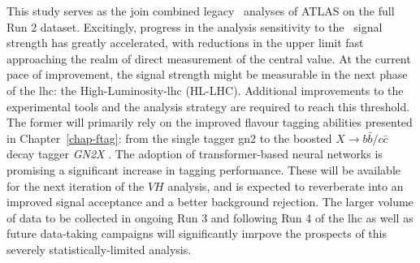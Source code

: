 This study serves as the join combined legacy \vhbc\ analyses of ATLAS on the full Run 2 dataset. Excitingly, progress in the analysis sensitivity to the \vhc\ signal strength has greatly accelerated, with reductions in the upper limit fast approaching the realm of direct measurement of the central value. At the current pace of improvement, the signal strength might be measurable in the next phase of the \gls{lhc}: the High-Luminosity-\gls{lhc} (HL-LHC). Additional improvements to the experimental tools and the analysis strategy are required to reach this threshold. The former will primarily rely on the improved flavour tagging abilities presented in Chapter~\ref{chap-ftag}: from the single tagger \gls{gn2} to the boosted $X \rightarrow b\bar{b} / c\bar{c}$ decay tagger \textit{GN2X} \cite{ATL-PHYS-PUB-2023-021}. The adoption of transformer-based neural networks is promising a significant increase in tagging performance. These will be available for the next iteration of the $VH$ analysis, and is expected to reverberate into an improved signal acceptance and a better background rejection. The larger volume of data to be collected in ongoing Run 3 and following Run 4 of the \gls{lhc} as well as future data-taking campaigns will significantly imrpove the prospects of this severely statistically-limited analysis. 
